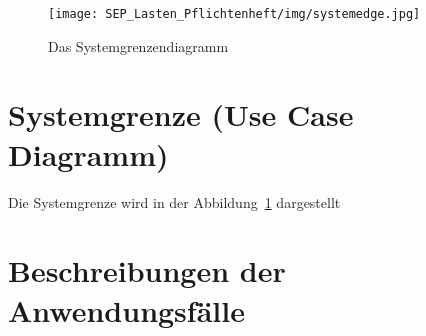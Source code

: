 \begin{figure}
\centering	
\texttt{[image: SEP\_Lasten\_Pflichtenheft/img/systemedge.jpg]}
\label{fig:sys}
\caption{Das Systemgrenzendiagramm}
\end{figure}

\section{Systemgrenze (Use Case Diagramm)}

Die Systemgrenze wird in der Abbildung~\ref{fig:sys} dargestellt


\section{Beschreibungen der Anwendungsfälle}

\setcounter{uc}{10}

